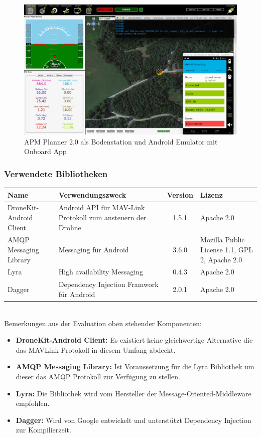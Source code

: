 \begin{figure}[H]
	\includegraphics[width=1.0\textwidth]{images/test-setup-onboard.png}
	\caption{APM Planner 2.0 als Bodenstation und Android Emulator mit Onboard App}
	\label{fig:test-setup-onboard}
\end{figure}

\subsubsection{Verwendete Bibliotheken}
\begin{tabularx}{\textwidth}{|X|X|c|X|}
	\hline
	\textbf{Name} & \textbf{Verwendungszweck} & \textbf{Version} & \textbf{Lizenz} \\
	\hline \hline
	DroneKit-Android Client & Android API für MAV-Link Protokoll zum ansteuern der Drohne & 1.5.1 & Apache 2.0\\
	\hline 
	AMQP Messaging Library & Messaging für Android & 3.6.0 &  Mozilla Public License 1.1, GPL 2,  Apache 2.0 \\
	\hline 
	Lyra  & High availability Messaging & 0.4.3 &  Apache 2.0 \\
	\hline 
	Dagger  & Dependency Injection Framwork für Android & 2.0.1 &  Apache 2.0 \\
	\hline 
\end{tabularx} \\

Bemerkungen aus der Evaluation oben stehender Komponenten:
\begin{itemize}
	\item{\textbf{DroneKit-Android Client:} Es existiert keine gleichwertige Alternative die das \Gls{MAVLink} Protokoll in diesem Umfang abdeckt.}
	\item{\textbf{AMQP Messaging Library:} Ist Voraussetzung für die Lyra Bibliothek um dieser das \Gls{AMQP} Protokoll zur Verfügung zu stellen.}
	\item{\textbf{Lyra:} Die Bibliothek wird vom Hersteller der Message-Oriented-Middleware empfohlen. \cite[]{lyra-page} }
	\item{\textbf{Dagger:} Wird von Google entwickelt und unterstützt Dependency Injection zur Kompilierzeit.}
\end{itemize}

